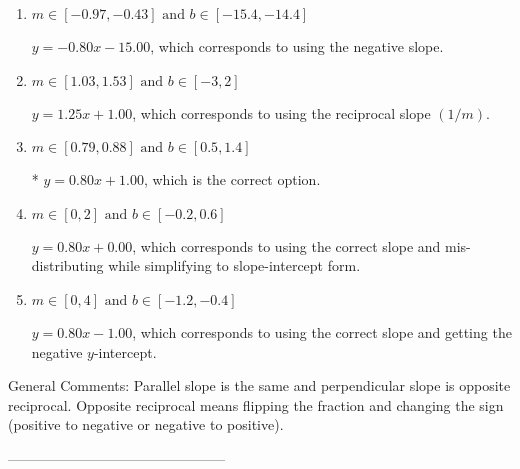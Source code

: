 \documentclass{article}[14pt]
\begin{document}
\begin{enumerate}[label=\Alph*.] 
\item $ m \in [-0.97, -0.43] \text{ and } b \in [-15.4, -14.4] $ 

  $y = -0.80x - 15.00$, which corresponds to using the negative slope. 
\item $ m \in [1.03, 1.53] \text{ and } b \in [-3, 2] $ 

  $y = 1.25x + 1.00$, which corresponds to using the reciprocal slope $(1/m)$. 
\item $ m \in [0.79, 0.88] \text{ and } b \in [0.5, 1.4] $ 

 * $y = 0.80x + 1.00$, which is the correct option. 
\item $ m \in [0, 2] \text{ and } b \in [-0.2, 0.6] $ 

  $y = 0.80x + 0.00$, which corresponds to using the correct slope and mis-distributing while simplifying to slope-intercept form. 
\item $ m \in [0, 4] \text{ and } b \in [-1.2, -0.4] $ 

  $y = 0.80x - 1.00$, which corresponds to using the correct slope and getting the negative $y$-intercept. 
\end{enumerate} 
 
General Comments: Parallel slope is the same and perpendicular slope is opposite reciprocal. Opposite reciprocal means flipping the fraction and changing the sign (positive to negative or negative to positive).

-----------------------------------------------
\end{document}
